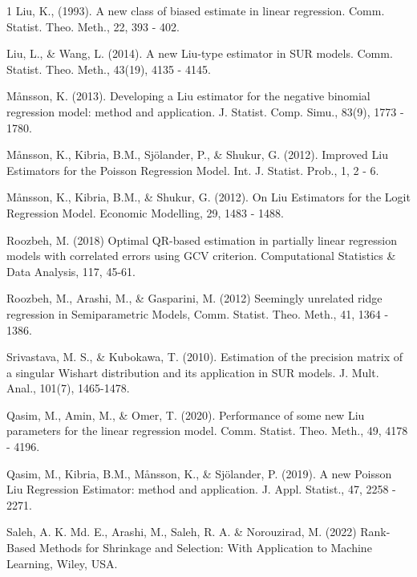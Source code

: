 \documentclass{article}
\begin{document}
\begin{thebibliography}{1}
Liu, K., (1993). A new class of biased estimate in linear regression. Comm. Statist. Theo. Meth., 22, 393 - 402.

Liu, L., \& Wang, L. (2014). A new Liu-type estimator in SUR models. Comm. Statist. Theo. Meth., 43(19), 4135 - 4145.

Månsson, K. (2013). Developing a Liu estimator for the negative binomial regression model: method and application. J. Statist. Comp. Simu., 83(9), 1773 - 1780.

Månsson, K., Kibria, B.M., Sjölander, P., \& Shukur, G. (2012). Improved Liu Estimators for the Poisson Regression Model. Int. J. Statist. Prob., 1, 2 - 6.

Månsson, K., Kibria, B.M., \& Shukur, G. (2012). On Liu Estimators for the Logit Regression Model. Economic Modelling, 29, 1483 - 1488.

Roozbeh, M. (2018) {Optimal QR-based estimation in partially linear regression models with correlated errors using GCV criterion.} {Computational Statistics \& Data Analysis}, 117, 45-61.

Roozbeh, M., Arashi, M., \& Gasparini, M. (2012) Seemingly unrelated ridge regression in Semiparametric Models, Comm. Statist. Theo. Meth., 41, 1364 - 1386.

Srivastava, M. S., \& Kubokawa, T. (2010). Estimation of the precision matrix of a singular Wishart distribution and its application in SUR models. J. Mult. Anal., 101(7), 1465-1478.
		

Qasim, M., Amin, M., \& Omer, T. (2020). Performance of some new Liu parameters for the linear regression model. Comm. Statist. Theo. Meth., 49, 4178 - 4196.

Qasim, M., Kibria, B.M., Månsson, K., \& Sjölander, P. (2019). A new Poisson Liu Regression Estimator: method and application. J. Appl. Statist., 47, 2258 - 2271.
		
		
Saleh, A. K. Md. E., Arashi, M., Saleh, R. A. \& Norouzirad, M. (2022) Rank-Based Methods for Shrinkage and Selection: With Application to Machine Learning, Wiley, USA.


\end{thebibliography}
\end{document}
